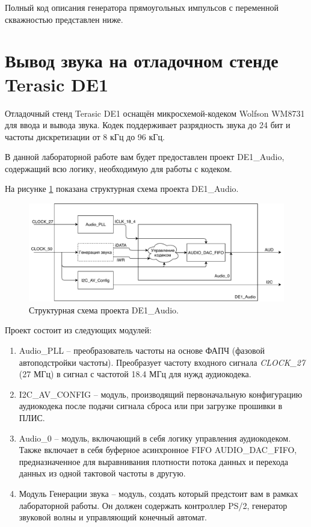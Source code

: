 Полный код описания генератора прямоугольных импульсов с переменной скважностью представлен ниже.


\noindent
\begin{minipage}{\linewidth}
	
\end{minipage}



\section{Вывод звука на отладочном стенде Terasic DE1}

Отладочный стенд Terasic DE1 оснащён микросхемой-кодеком Wolfson WM8731 для ввода и вывода звука. Кодек поддерживает разрядность звука до 24 бит и частоты дискретизации от 8 кГц до 96 кГц.


В данной лабораторной работе вам будет предоставлен проект DE1\_Audio, содержащий всю логику, необходимую для работы с кодеком.

На рисунке \ref{lab7:pic7} показана структурная схема проекта DE1\_Audio.

\begin{figure}[H]
	\centering
	\includegraphics [width=1\textwidth] {images/lab_7/DE1_Audio.pdf}
	\caption{Структурная схема проекта DE1\_Audio.}
	\label{lab7:pic7}
\end{figure}

Проект состоит из следующих модулей:
\begin{enumerate}
	\item Audio\_PLL -- преобразователь частоты на основе ФАПЧ (фазовой автоподстройки частоты). Преобразует частоту входного сигнала \textit{CLOCK\_27} (27 МГц) в сигнал с частотой 18.4 МГц для нужд аудиокодека.
	\item I2C\_AV\_CONFIG -- модуль, производящий первоначальную конфигурацию аудиокодека после подачи сигнала сброса или при загрузке прошивки в ПЛИС.
	\item Audio\_0 -- модуль, включающий в себя логику управления аудиокодеком. Также включает в себя буферное асинхронное FIFO AUDIO\_DAC\_FIFO, предназначенное для выравнивания плотности потока данных и перехода данных из одной тактовой частоты в другую.
	\item Модуль Генерации звука -- модуль, создать который предстоит вам в рамках лабораторной работы. Он должен содержать контроллер PS/2, генератор звуковой волны и управляющий конечный автомат.

\end{enumerate}

